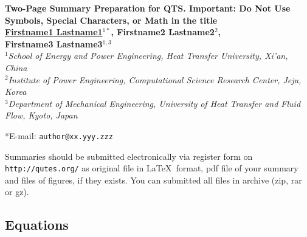 \documentclass[a4paper,10pt]{article}
\begin{document}
 
\begin{center}
\mbox{}

{\large{\bfseries  {Two-Page Summary Preparation for QTS. Important: Do Not Use Symbols, Special Characters, or Math in the title}}} %
\\[8pt]

\textbf{{\underline{Firstname1 Lastname1}$^{1*}$}, Firstname2 Lastname2$^2$, \\Firstname3 Lastname3$^{1,3}$}
\\[8pt]

\small{\textit{
$^1$School of Energy and Power Engineering, Heat Transfer University, Xi'an, China \\
$^2$Institute of Power Engineering, Computational Science Research Center, Jeju, Korea \\
$^3$Department of Mechanical Engineering, University of Heat Transfer and Fluid Flow, Kyoto, Japan \\
}}

*E-mail: {\tt author@xx.yyy.zzz}

\end{center}
\vspace{0.2cm}

\begin{abstract}
This section of the paper should be a single paragraph abstract
outlining the aims, scope and conclusion of the summary. While no word limit is imposed, authors should aim for an abstract length of about 300 words for full papers or about 50 words for shorter contributions.    
\end{abstract}
\vspace{10pt}

Summaries should be submitted electronically via register form on {\tt \small http://qutes.org/} as original file in \LaTeX\ format, pdf file of your summary and files of figures, if they exists. You can submitted all files in archive (zip, rar or gz).




\subsection*{Equations}
\end{document}
